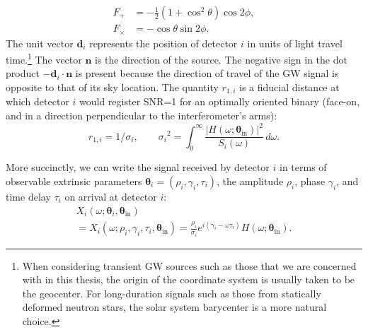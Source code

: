\documentclass[amsmath,amssymb,aps,prx,reprint,nopreprintnumbers,nofootinbib]{revtex4-1}
\begin{document}
%
\begin{align}
    F_+ &= -\frac{1}{2}(1 + \cos^2 \theta) \cos{2\phi}, \\
    F_\times &= -\cos\theta \sin{2\phi}.
\end{align}
%
The unit vector $\mathbf{d}_i$ represents the position of detector $i$ in units of light travel time.\footnote{When considering transient \ac{GW} sources such as those that we are concerned with in this thesis, the origin of the coordinate system is usually taken to be the geocenter. For long\nobreakdashes-duration signals such as those from statically deformed neutron stars, the solar system barycenter is a more natural choice.} The vector $\mathbf{n}$ is the direction of the source. The negative sign in the dot product $-\mathbf{d}_i \cdot \mathbf{n}$ is present because the direction of travel of the \ac{GW} signal is opposite to that of its sky location. The quantity $r_{1,i}$ is a fiducial distance at which detector $i$ would register SNR=1 for an optimally oriented binary (face\nobreakdashes-on, and in a direction perpendicular to the interferometer's arms):
%
\begin{equation}\label{eq:horizon}
r_{1,i} = 1 / \sigma_i, \qquad {\sigma_i}^2 = \int_0^\infty \frac{\left|H(\omega; \boldsymbol \theta_\mathrm{in})\right|^2}{S_i(\omega)} \,d\omega.
\end{equation}

More succinctly, we can write the signal received by detector $i$ in terms of observable extrinsic parameters $\bm\theta_i = (\rho_i, \gamma_i, \tau_i)$, the amplitude $\rho_i$, phase $\gamma_i$, and time delay $\tau_i$ on arrival at detector $i$:
%
\begin{multline}\label{eq:signal-model}
    X_i (\omega; \bm\theta_i, \bm\theta_\mathrm{in})
    \\
    = X_i (\omega; \rho_i, \gamma_i, \tau_i, \bm\theta_\mathrm{in}) = \frac{\rho_i}{\sigma_i} e^{i (\gamma_i - \omega \tau_i)} H(\omega; \bm\theta_\mathrm{in}).
\end{multline}
\end{document}
